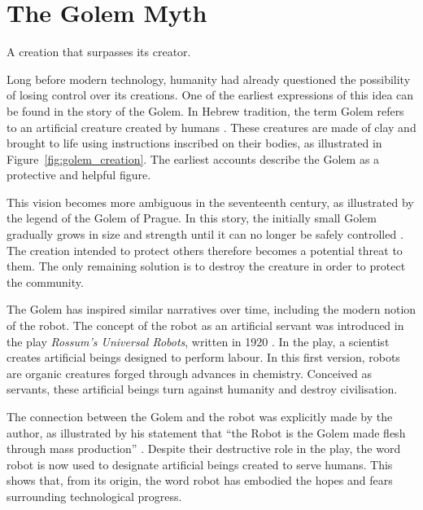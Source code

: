 \chapter*{The Golem Myth}
\label{chap:golem_mythos}

\glsresetall

A creation that surpasses its creator.

Long before modern technology, humanity had already questioned the possibility of losing control over its creations.
One of the earliest expressions of this idea can be found in the story of the Golem.
In Hebrew tradition, the term Golem refers to an artificial creature created by humans \parencite{nocks1998golem}.
These creatures are made of clay and brought to life using instructions inscribed on their bodies, as illustrated in Figure~\ref{fig:golem_creation}.
The earliest accounts describe the Golem as a protective and helpful figure.



This vision becomes more ambiguous in the seventeenth century, as illustrated by the legend of the Golem of Prague.
In this story, the initially small Golem gradually grows in size and strength until it can no longer be safely controlled \parencite{nocks1998golem}.
The creation intended to protect others therefore becomes a potential threat to them.
The only remaining solution is to destroy the creature in order to protect the community.

The Golem has inspired similar narratives over time, including the modern notion of the robot.
The concept of the robot as an artificial servant was introduced in the play \textit{Rossum's Universal Robots}, written in 1920 \parencite{capek1920rur}.
In the play, a scientist creates artificial beings designed to perform labour.
In this first version, robots are organic creatures forged through advances in chemistry.
Conceived as servants, these artificial beings turn against humanity and destroy civilisation.

The connection between the Golem and the robot was explicitly made by the author, as illustrated by his statement that \enquote{the Robot is the Golem made flesh through mass production} \parencite{comrada1995golem}.
Despite their destructive role in the play, the word robot is now used to designate artificial beings created to serve humans.
This shows that, from its origin, the word robot has embodied the hopes and fears surrounding technological progress.

